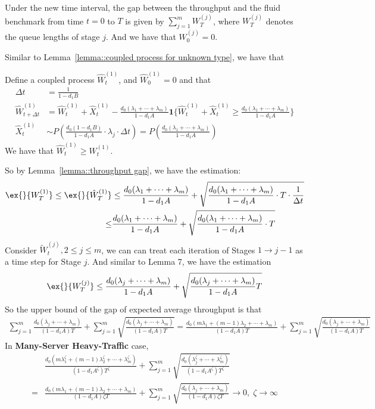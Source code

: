 \documentclass[opre, nonblindrev]{informs3} %
\begin{document}
Under the new time interval, the gap between the throughput and the fluid benchmark
from time $t=0$ to $T$ is given by $\sum_{j=1}^mW_T^{(j)}$, where $W_T^{(j)}$ denotes the queue lengths of stage $j$. And we have that $W_0^{(j)}=0$.

Similar to Lemma~\ref{lemma::coupled process for unknown type}, we have that 
\begin{lemma}
    Define a coupled process $\hat{W}_t^{(1)}$, and $\hat{W}_0^{(1)}=0$ and that
    \begin{align*}
    \Delta t&=\frac{1}{1-d_1B}\\
        \hat{W}_{t+\Delta t}^{(1)} &= \hat{W}_{t}^{(1)}+\hat{X}_t^{(1)}-\frac{d_0(\lambda_1+\cdots+\lambda_m)}{1-d_1A}\mathbf{1}\{\hat{W}_{t}^{(1)}+\hat{X}_t^{(1)}\geq \frac{d_0(\lambda_1+\cdots+\lambda_m)}{1-d_1A}\}\\
        \hat{X}_t^{(1)}&\sim P(\frac{d_0(1-d_1B)}{1-d_1A}\cdot \lambda_j\cdot \Delta t)=P(\frac{d_0(\lambda_1+\cdots+\lambda_m)}{1-d_1A})
    \end{align*}
    We have that $\hat{W}_t^{(1)}\geq W_t^{(1)}$.   
\end{lemma}

So by Lemma~\ref{lemma::throughput gap}, we have the estimation:
\begin{align*}
    \ex{}{W_T^{(1)}}\leq \ex{}{\hat{W}_T^{(1)}}&\leq \frac{d_0(\lambda_1+\cdots+\lambda_m)}{1-d_1A}+\sqrt{\frac{d_0(\lambda_1+\cdots+\lambda_m)}{1-d_1A}\cdot T\cdot \frac{1}{\Delta t}}\\
    \leq &\frac{d_0(\lambda_1+\cdots+\lambda_m)}{1-d_1A}+\sqrt{\frac{d_0(\lambda_1+\cdots+\lambda_m)}{1-d_1A}\cdot T}
\end{align*}
Consider $\tilde{W}_t^{(j)}, 2\leq j\leq m$, we can can treat each iteration of Stages $1\to j-1$ as a time step for Stage $j$. And similar to Lemma 7, we have the estimation
\begin{align*}
    \ex{}{W_T^{(j)}}\leq \frac{d_0(\lambda_j+\cdots+\lambda_m)}{1-d_1A}+\sqrt{\frac{d_0(\lambda_j+\cdots+\lambda_m)}{1-d_1A}T}
\end{align*}
So the upper bound of the gap of expected average throughput is that
\begin{align*}
\sum_{j=1}^m\frac{d_0(\lambda_j+\cdots+\lambda_m)}{(1-d_1A)T}+\sum_{j=1}^m\sqrt{\frac{d_0(\lambda_j+\cdots+\lambda_m)}{(1-d_1A)T}}=\frac{d_0(m\lambda_1+(m-1)\lambda_2+\cdots+\lambda_m)}{(1-d_1A)T}+\sum_{j=1}^m\sqrt{\frac{d_0(\lambda_j+\cdots+\lambda_m)}{(1-d_1A)T}}
\end{align*}
In \textbf{Many-Server Heavy-Traffic} case,
\begin{align*}
&\frac{d_0(m\lambda_1^{\zeta}+(m-1)\lambda_2^{\zeta}+\cdots+\lambda_m^{\zeta})}{(1-d_1A^{\zeta})T^{\zeta}}+\sum_{j=1}^m\sqrt{\frac{d_0(\lambda_j^{\zeta}+\cdots+\lambda_m^{\zeta})}{(1-d_1A^{\zeta})T^{\zeta}}}  \\=&\frac{d_0(m\lambda_1+(m-1)\lambda_2+\cdots+\lambda_m)}{(1-d_1A)\zeta T}+\sum_{j=1}^m\sqrt{\frac{d_0(\lambda_j+\cdots+\lambda_m)}{(1-d_1A)\zeta T}}\to 0,\; \zeta \to \infty
\end{align*}
\end{document}
